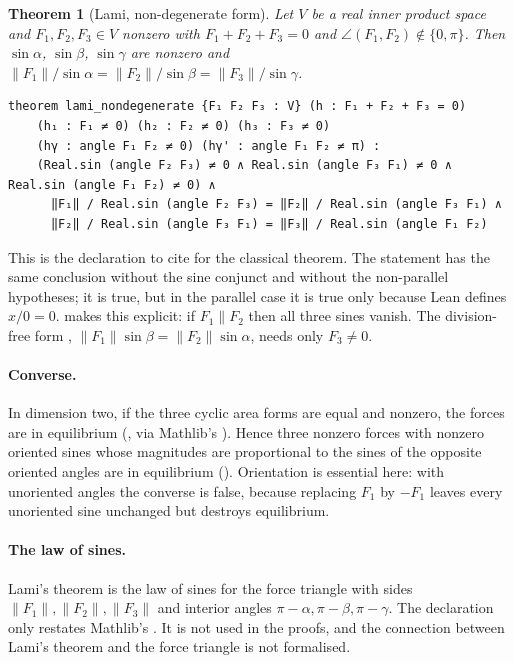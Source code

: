 \documentclass[11pt]{article}
\newtheorem{theorem}{Theorem}
\theoremstyle{definition}
\theoremstyle{remark}
\begin{document}
\begin{theorem}[Lami, non-degenerate form]\label{thm:lami}
Let $V$ be a real inner product space and $F_1,F_2,F_3\in V$ nonzero with $F_1+F_2+F_3=0$ and
$\angle(F_1,F_2)\notin\{0,\pi\}$. Then $\sin\alpha$, $\sin\beta$, $\sin\gamma$ are nonzero and
$\|F_1\|/\sin\alpha=\|F_2\|/\sin\beta=\|F_3\|/\sin\gamma$.
\end{theorem}

\begin{lstlisting}
theorem lami_nondegenerate {F₁ F₂ F₃ : V} (h : F₁ + F₂ + F₃ = 0)
    (h₁ : F₁ ≠ 0) (h₂ : F₂ ≠ 0) (h₃ : F₃ ≠ 0)
    (hγ : angle F₁ F₂ ≠ 0) (hγ' : angle F₁ F₂ ≠ π) :
    (Real.sin (angle F₂ F₃) ≠ 0 ∧ Real.sin (angle F₃ F₁) ≠ 0 ∧ Real.sin (angle F₁ F₂) ≠ 0) ∧
      ‖F₁‖ / Real.sin (angle F₂ F₃) = ‖F₂‖ / Real.sin (angle F₃ F₁) ∧
      ‖F₂‖ / Real.sin (angle F₃ F₁) = ‖F₃‖ / Real.sin (angle F₁ F₂)
\end{lstlisting}

This is the declaration to cite for the classical theorem. The statement  has the
same conclusion without the sine conjunct and without the non-parallel hypotheses; it is true, but
in the parallel case it is true only because Lean defines $x/0=0$. 
makes this explicit: if $F_1\parallel F_2$ then all three sines vanish. The division-free form
, $\|F_1\|\sin\beta=\|F_2\|\sin\alpha$, needs only $F_3\ne0$.

\paragraph{Converse.} In dimension two, if the three cyclic area forms are equal and nonzero, the
forces are in equilibrium (, via Mathlib's
). Hence three nonzero forces with nonzero oriented sines
whose magnitudes are proportional to the sines of the opposite oriented angles are in equilibrium
(). Orientation is essential here: with unoriented angles the
converse is false, because replacing $F_1$ by $-F_1$ leaves every unoriented sine unchanged but
destroys equilibrium.

\paragraph{The law of sines.} Lami's theorem is the law of sines for the force triangle with sides
$\|F_1\|,\|F_2\|,\|F_3\|$ and interior angles $\pi-\alpha,\pi-\beta,\pi-\gamma$. The declaration
 only restates Mathlib's
. It is not used in the
proofs, and the connection between Lami's theorem and the force triangle is not formalised.
\end{document}
